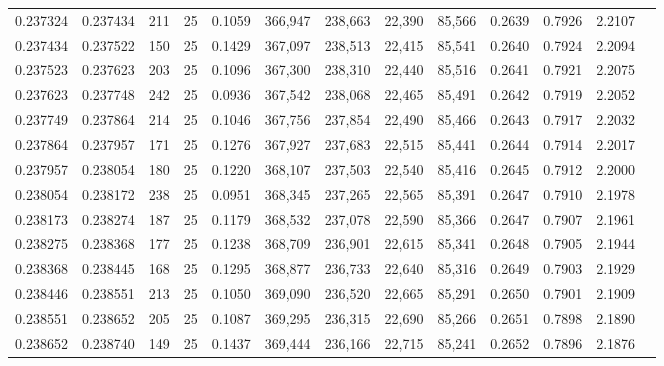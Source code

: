 \begin{tabular}{rrrrrrrrrrrrr}
0.237324 & 0.237434 &   211 &  25 &                                     0.1059 & 366,947 & 238,663 &  22,390 &  85,566 & 0.2639 & 0.7926 & 2.2107 \\
0.237434 & 0.237522 &   150 &  25 &                                     0.1429 & 367,097 & 238,513 &  22,415 &  85,541 & 0.2640 & 0.7924 & 2.2094 \\
0.237523 & 0.237623 &   203 &  25 &                                     0.1096 & 367,300 & 238,310 &  22,440 &  85,516 & 0.2641 & 0.7921 & 2.2075 \\
0.237623 & 0.237748 &   242 &  25 &                                     0.0936 & 367,542 & 238,068 &  22,465 &  85,491 & 0.2642 & 0.7919 & 2.2052 \\
0.237749 & 0.237864 &   214 &  25 &                                     0.1046 & 367,756 & 237,854 &  22,490 &  85,466 & 0.2643 & 0.7917 & 2.2032 \\
0.237864 & 0.237957 &   171 &  25 &                                     0.1276 & 367,927 & 237,683 &  22,515 &  85,441 & 0.2644 & 0.7914 & 2.2017 \\
0.237957 & 0.238054 &   180 &  25 &                                     0.1220 & 368,107 & 237,503 &  22,540 &  85,416 & 0.2645 & 0.7912 & 2.2000 \\
0.238054 & 0.238172 &   238 &  25 &                                     0.0951 & 368,345 & 237,265 &  22,565 &  85,391 & 0.2647 & 0.7910 & 2.1978 \\
0.238173 & 0.238274 &   187 &  25 &                                     0.1179 & 368,532 & 237,078 &  22,590 &  85,366 & 0.2647 & 0.7907 & 2.1961 \\
0.238275 & 0.238368 &   177 &  25 &                                     0.1238 & 368,709 & 236,901 &  22,615 &  85,341 & 0.2648 & 0.7905 & 2.1944 \\
0.238368 & 0.238445 &   168 &  25 &                                     0.1295 & 368,877 & 236,733 &  22,640 &  85,316 & 0.2649 & 0.7903 & 2.1929 \\
0.238446 & 0.238551 &   213 &  25 &                                     0.1050 & 369,090 & 236,520 &  22,665 &  85,291 & 0.2650 & 0.7901 & 2.1909 \\
0.238551 & 0.238652 &   205 &  25 &                                     0.1087 & 369,295 & 236,315 &  22,690 &  85,266 & 0.2651 & 0.7898 & 2.1890 \\
0.238652 & 0.238740 &   149 &  25 &                                     0.1437 & 369,444 & 236,166 &  22,715 &  85,241 & 0.2652 & 0.7896 & 2.1876 \\

\end{tabular}
